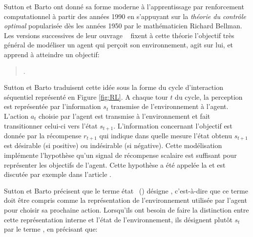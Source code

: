 Sutton et Barto ont donné sa forme moderne à l'apprentissage par renforcement computationnel à partir des années 1990 en s'appuyant sur la \emph{théorie du contrôle optimal} popularisée dès les années 1950 par le mathématicien Richard Bellman.
Les versions successives de leur ouvrage \og {} \fg\ \cite{sutton_reinforcement_2018} fixent à cette théorie l'objectif très général de modéliser un agent qui perçoit son environnement, agit sur lui, et apprend à atteindre un objectif:


\begin{quote}
	\cite[p.~2]{sutton_reinforcement_2018}.
\end{quote}

Sutton et Barto traduisent cette idée sous la forme du cycle d'interaction séquentiel représenté en Figure \ref{fig:RL}. 
A chaque tour $t$ du cycle, la perception est représentée par l'information $s_t$ transmise de l'environnement à l'agent. 
L'action $a_t$ choisie par l'agent est transmise à l'environnement et fait transitionner celui-ci vers l'état $s_{t+1}$. 
L'information concernant l'objectif est donnée par la récompense $r_{t+1}$ qui indique dans quelle mesure l'état obtenu $s_{t+1}$ est désirable (si positive) ou indésirable (si négative).
Cette modélisation implémente l'hypothèse qu'un signal de récompense scalaire est suffisant pour représenter les objectifs de l'agent. 
Cette hypothèse a été appelée la  et est discutée par exemple dans l'article  \cite{silver_reward_2021}. 

Sutton et Barto précisent que le terme \og état \fg\ () désigne  \cite[p.~62]{sutton_reinforcement_2018}, c'est-à-dire que ce terme doit être compris comme la représentation de l'environnement utilisée par l'agent pour choisir sa prochaine action. %
Lorsqu'ils ont besoin de faire la distinction entre cette représentation interne et l'état de l'environnement, ils désignent plutôt $s_t$ par le terme , en précisant que: 

